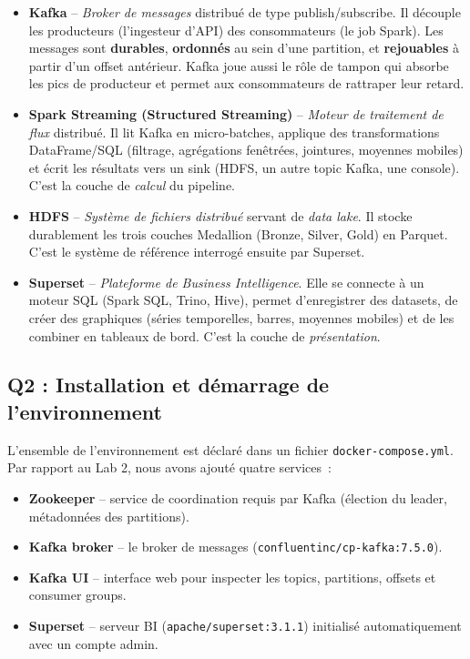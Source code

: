 \documentclass{RapportINPTCLOUD}
\begin{document}
\begin{itemize}[leftmargin=2em]
    \item \textbf{Kafka} -- \textit{Broker de messages} distribu\'{e} de type publish/subscribe. Il d\'{e}couple les producteurs (l'ingesteur d'API) des consommateurs (le job Spark). Les messages sont \textbf{durables}, \textbf{ordonn\'{e}s} au sein d'une partition, et \textbf{rejouables} \`{a} partir d'un offset ant\'{e}rieur. Kafka joue aussi le r\^{o}le de tampon qui absorbe les pics de producteur et permet aux consommateurs de rattraper leur retard.

    \item \textbf{Spark Streaming (Structured Streaming)} -- \textit{Moteur de traitement de flux} distribu\'{e}. Il lit Kafka en micro-batches, applique des transformations DataFrame/SQL (filtrage, agr\'{e}gations fen\^{e}tr\'{e}es, jointures, moyennes mobiles) et \'{e}crit les r\'{e}sultats vers un sink (HDFS, un autre topic Kafka, une console). C'est la couche de \textit{calcul} du pipeline.

    \item \textbf{HDFS} -- \textit{Syst\`{e}me de fichiers distribu\'{e}} servant de \textit{data lake}. Il stocke durablement les trois couches Medallion (Bronze, Silver, Gold) en Parquet. C'est le syst\`{e}me de r\'{e}f\'{e}rence interrog\'{e} ensuite par Superset.

    \item \textbf{Superset} -- \textit{Plateforme de Business Intelligence}. Elle se connecte \`{a} un moteur SQL (Spark SQL, Trino, Hive), permet d'enregistrer des datasets, de cr\'{e}er des graphiques (s\'{e}ries temporelles, barres, moyennes mobiles) et de les combiner en tableaux de bord. C'est la couche de \textit{pr\'{e}sentation}.
\end{itemize}

\subsection{Q2 : Installation et d\'{e}marrage de l'environnement}

L'ensemble de l'environnement est d\'{e}clar\'{e} dans un fichier \texttt{docker-compose.yml}. Par rapport au Lab 2, nous avons ajout\'{e} quatre services~:

\begin{itemize}[leftmargin=2em]
    \item \textbf{Zookeeper} -- service de coordination requis par Kafka (\'{e}lection du leader, m\'{e}tadonn\'{e}es des partitions).
    \item \textbf{Kafka broker} -- le broker de messages (\texttt{confluentinc/cp-kafka:7.5.0}).
    \item \textbf{Kafka UI} -- interface web pour inspecter les topics, partitions, offsets et consumer groups.
    \item \textbf{Superset} -- serveur BI (\texttt{apache/superset:3.1.1}) initialis\'{e} automatiquement avec un compte admin.
\end{itemize}
\end{document}
